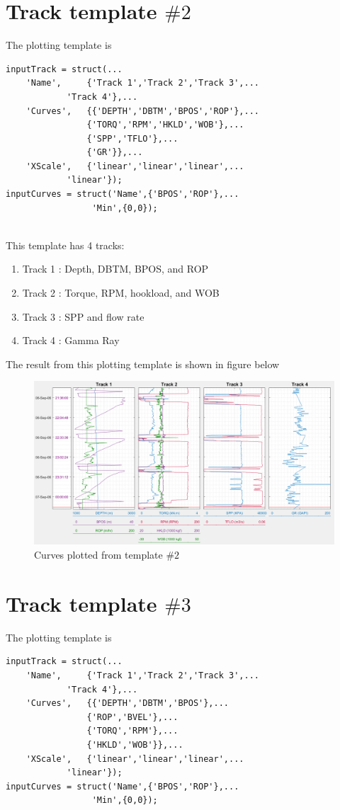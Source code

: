 \documentclass[12pt,a4paper,oneside]{report}
\begin{document}
\pagebreak
\section{Track template $\#2$}
The plotting template is
\begin{lstlisting}[style=Matlab-editor]
inputTrack = struct(...
    'Name',     {'Track 1','Track 2','Track 3',...
    		'Track 4'},...
    'Curves',   {{'DEPTH','DBTM','BPOS','ROP'},...
                {'TORQ','RPM','HKLD','WOB'},...
                {'SPP','TFLO'},...
                {'GR'}},...
    'XScale',   {'linear','linear','linear',...
    		'linear'});
inputCurves = struct('Name',{'BPOS','ROP'},...
    		     'Min',{0,0});
    
\end{lstlisting}

\noindent This template has 4 tracks:
\begin{enumerate}
\setlength\itemsep{0.1em}
\item Track 1 : Depth, DBTM, BPOS, and ROP
\item Track 2 : Torque, RPM, hookload, and WOB
\item Track 3 : SPP and flow rate
\item Track 4 : Gamma Ray
\end{enumerate}

\noindent The result from this plotting template is shown in figure below
\begin{figure}[H]
\centering
\includegraphics[width=\textwidth]{fig/example2.PNG}
\caption{Curves plotted from template $\#2$}
\end{figure}

\pagebreak
\section{Track template $\#3$}
The plotting template is
\begin{lstlisting}[style=Matlab-editor]
inputTrack = struct(...
    'Name',     {'Track 1','Track 2','Track 3',...
    		'Track 4'},...
    'Curves',   {{'DEPTH','DBTM','BPOS'},...
                {'ROP','BVEL'},...
                {'TORQ','RPM'},...
                {'HKLD','WOB'}},...
    'XScale',   {'linear','linear','linear',...
    		'linear'});
inputCurves = struct('Name',{'BPOS','ROP'},...
    		     'Min',{0,0});
    
\end{lstlisting}
\end{document}
